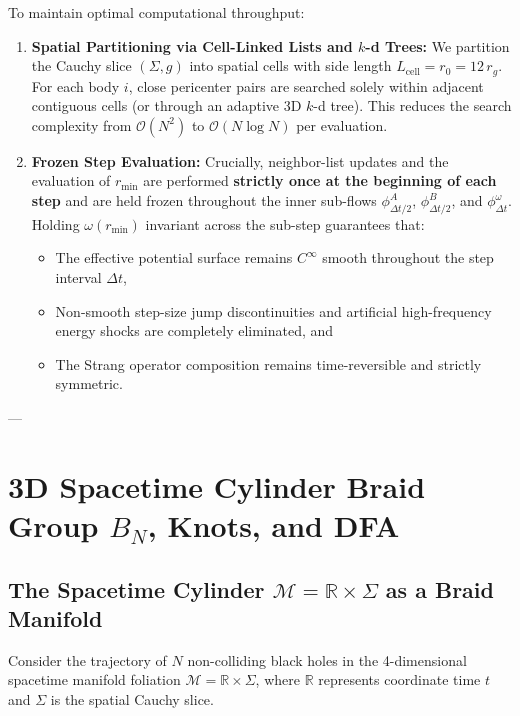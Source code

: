 \documentclass[11pt,a4paper,reqno]{article}
\theoremstyle{plain}
\theoremstyle{definition}
\theoremstyle{remark}
\numberwithin{equation}{section}
\begin{document}
To maintain optimal computational throughput:
\begin{enumerate}
    \item \textbf{Spatial Partitioning via Cell-Linked Lists and $k$-d Trees:} We partition the Cauchy slice $(\Sigma, g)$ into spatial cells with side length $L_{\mathrm{cell}} = r_0 = 12 \, r_g$. For each body $i$, close pericenter pairs are searched solely within adjacent contiguous cells (or through an adaptive 3D $k$-d tree). This reduces the search complexity from $\mathcal{O}(N^2)$ to $\mathcal{O}(N \log N)$ per evaluation.
    \item \textbf{Frozen Step Evaluation:} Crucially, neighbor-list updates and the evaluation of $r_{\min}$ are performed \textbf{strictly once at the beginning of each step} and are held frozen throughout the inner sub-flows $\phi_{\Delta t/2}^A$, $\phi_{\Delta t/2}^B$, and $\phi_{\Delta t}^\omega$. Holding $\omega(r_{\min})$ invariant across the sub-step guarantees that:
    \begin{itemize}
        \item The effective potential surface remains $C^\infty$ smooth throughout the step interval $\Delta t$,
        \item Non-smooth step-size jump discontinuities and artificial high-frequency energy shocks are completely eliminated, and
        \item The Strang operator composition remains time-reversible and strictly symmetric.
    \end{itemize}
\end{enumerate}

---

\section{3D Spacetime Cylinder Braid Group \texorpdfstring{$B_N$}{BN}, Knots, and DFA}

\subsection{The Spacetime Cylinder \texorpdfstring{$\mathcal{M} = \mathbb{R} \times \Sigma$}{M = R x Sigma} as a Braid Manifold}
Consider the trajectory of $N$ non-colliding black holes in the 4-dimensional spacetime manifold foliation $\mathcal{M} = \mathbb{R} \times \Sigma$, where $\mathbb{R}$ represents coordinate time $t$ and $\Sigma$ is the spatial Cauchy slice.
\end{document}
